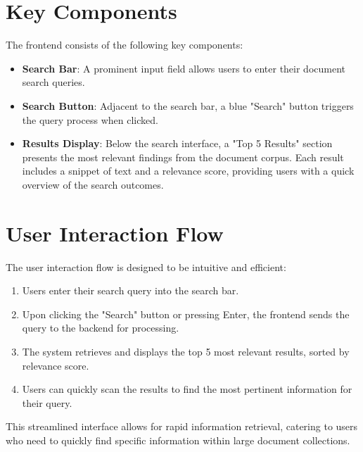 \documentclass[a4paper, 12pt]{report}
\begin{document}
\section{Key Components}

The frontend consists of the following key components:

\begin{itemize}
    \item \textbf{Search Bar}: A prominent input field allows users to enter their document search queries.
    
    \item \textbf{Search Button}: Adjacent to the search bar, a blue "Search" button triggers the query process when clicked.
    
    \item \textbf{Results Display}: Below the search interface, a "Top 5 Results" section presents the most relevant findings from the document corpus. Each result includes a snippet of text and a relevance score, providing users with a quick overview of the search outcomes.
\end{itemize}

\section{User Interaction Flow}

The user interaction flow is designed to be intuitive and efficient:

\begin{enumerate}
    \item Users enter their search query into the search bar.
    \item Upon clicking the "Search" button or pressing Enter, the frontend sends the query to the backend for processing.
    \item The system retrieves and displays the top 5 most relevant results, sorted by relevance score.
    \item Users can quickly scan the results to find the most pertinent information for their query.
\end{enumerate}

This streamlined interface allows for rapid information retrieval, catering to users who need to quickly find specific information within large document collections.
\end{document}
